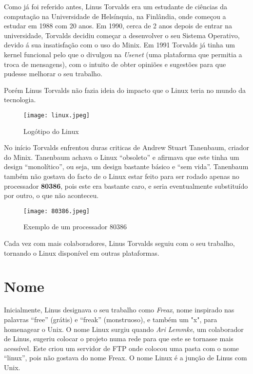 \documentclass{report}
\begin{document}
Como já foi referido antes, Linus Torvalds era um estudante de ciências da computação na Universidade de Helsínquia, na Finlândia, onde começou a estudar em 1988 com 20 anos. Em 1990, cerca de 2 anos depois de entrar na universidade, Torvalds decidiu começar a desenvolver o seu Sistema Operativo, devido á sua insatisfação com o uso do Minix.
Em 1991 Torvalds já tinha um kernel funcional pelo que o divulgou na \textit{Usenet} (uma plataforma que permitia a troca de mensagens), com o intuito de obter opiniões e sugestões para que pudesse melhorar o seu trabalho.

\vspace{5mm}

Porém Linus Torvalds não fazia ideia do impacto que o Linux teria no mundo da tecnologia.

\begin{figure}[h!]
    \centering
    \texttt{[image: linux.jpeg]}
    \caption{Logótipo do Linux}
\end{figure}

No início Torvalds enfrentou duras criticas de Andrew Stuart Tanenbaum, criador do Minix. Tanenbaum achava o Linux “obsoleto” e afirmava que este tinha um design “monolítico”, ou seja, um design bastante básico e “sem vida”. Tanenbaum também não gostava do facto de o Linux estar feito para ser rodado apenas no processador \textbf{80386}, pois este era bastante caro, e seria eventualmente substituído por outro, o que não aconteceu.

\begin{figure}
    \centering
    \texttt{[image: 80386.jpeg]}
    \caption{Exemplo de um processador 80386}
\end{figure}

Cada vez com mais colaboradores, Linus Torvalds seguiu com o seu trabalho, tornando o Linux disponível em outras plataformas.

\section{Nome}

Inicialmente, Linus designava o seu trabalho como \textit{Freax}, nome inspirado nas palavras “free” (grátis) e “freak” (monstruoso), e também um "x", para homenagear o Unix.
O nome Linux surgiu quando \textit{Ari Lemmke}, um colaborador de Linus, sugeriu colocar o projeto numa rede para que este se tornasse mais acessível. Este criou um servidor de FTP onde colocou uma pasta com o nome “linux”, pois não gostava do nome Freax. O nome Linux é a junção de Linus com Unix.
\end{document}
